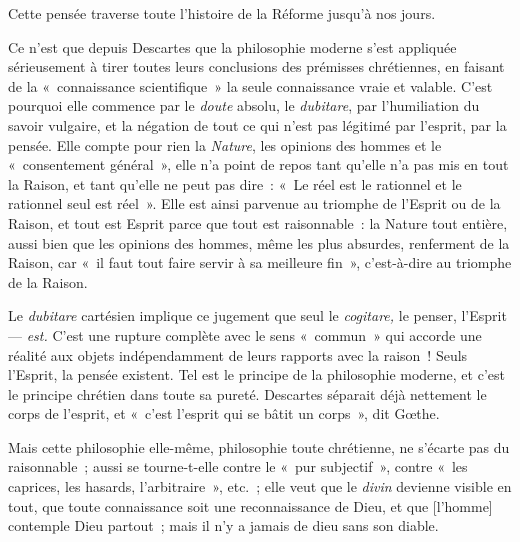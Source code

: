 \documentclass[french,twoside]{book} %
\newcommand\corr[1]{#1}
\begin{document}
Cette pensée traverse toute l’histoire de la Réforme jusqu’à nos jours.\par
Ce n’est que depuis Descartes que la philosophie moderne s’est appliquée sérieusement à tirer toutes  leurs conclusions des prémisses chrétiennes, en faisant de la « connaissance scientifique » la seule connaissance vraie et valable. C’est pourquoi elle commence par le \emph{doute} absolu, le \emph{dubitare}, par l’humiliation du savoir vulgaire, et la négation de tout ce qui n’est pas légitimé par l’esprit, par la pensée. Elle compte pour rien la \emph{Nature}, les opinions des hommes et le « consentement général », elle n’a point de repos tant qu’elle n’a pas mis en tout la Raison, et tant qu’elle ne peut pas dire : « Le réel est le rationnel et le rationnel seul est réel ». Elle est ainsi parvenue au triomphe de l’Esprit ou de la Raison, et tout est Esprit parce que tout est raisonnable : la Nature tout entière, aussi bien que les opinions des hommes, même les plus absurdes, renferment de la Raison, car « il faut tout faire servir à sa meilleure fin », c’est-à-dire au triomphe de la Raison.\par
Le \emph{dubitare} cartésien implique ce jugement que seul le \emph{cogitare,} le penser, l’Esprit — \emph{est.} C’est une rupture complète avec le sens « commun » qui accorde une réalité aux objets indépendamment de leurs rapports avec la raison ! Seuls l’Esprit, la pensée existent. Tel est le principe de la philosophie moderne, et c’est le principe chrétien dans toute sa pureté. Descartes séparait déjà nettement le corps de l’esprit, et « c’est l’esprit qui se bâtit un corps », dit Gœthe.\par
Mais cette philosophie elle-même, philosophie toute chrétienne, ne s’écarte pas du raisonnable ; aussi se tourne-t-elle contre le « pur subjectif », contre « les caprices, les hasards, l’arbitraire », etc. ; elle veut que le \emph{divin} devienne visible en tout, que toute connaissance soit une reconnaissance de Dieu, et que [{\corr l’homme}] contemple Dieu partout ; mais il n’y a jamais de dieu sans son diable.\par
\end{document}
